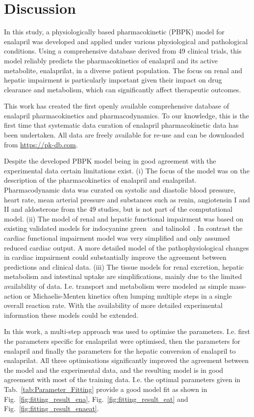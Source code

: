 \section{Discussion}\label{sec:discussion}\justifying{}
In this study, a physiologically based pharmacokinetic (PBPK) model for enalapril was developed and applied under various physiological and pathological conditions. Using a comprehensive database derived from 49 clinical trials, this model reliably predicts the pharmacokinetics of enalapril and its active metabolite, enalaprilat, in a diverse patient population. The focus on renal and hepatic impairment is particularly important given their impact on drug clearance and metabolism, which can significantly affect therapeutic outcomes.

This work has created the first openly available comprehensive database of enalapril pharmacokinetics and pharmacodynamics. To our knowledge, this is the first time that systematic data curation of enalapril pharmacokinetic data has been undertaken. All data are freely available for re-use and can be downloaded from \href{https://pk-db.com}{https://pk-db.com}.

Despite the developed PBPK model being in good agreement with the experimental data certain limitations exist. (i) The focus of the model was on the description of the pharmacokinetics of enalapril and enalaprilat. Pharmacodynamic data was curated on systolic and diastolic blood pressure, heart rate, mean arterial pressure and substances such as renin, angiotensin I and II and aldosterone from the 49 studies, but is not part of the computational model. (ii) The model of renal and hepatic functional impairment was based on existing validated models for indocyanine green~\cite{Koller2021, Koller2021a} and talinolol~\cite{Mallol2023}. In contrast the cardiac functional impairment model was very simplified and only assumed reduced cardiac output. A more detailed model of the pathophysiological changes in cardiac impairment could substantially improve the agreement between predictions and clinical data. (iii) The tissue models for renal excretion, hepatic metabolism and intestinal uptake are simplifications, mainly due to the limited availability of data. I.e. transport and metabolism were modeled as simple mass-action or Michaelis-Menten kinetics often lumping multiple steps in a single overall reaction rate. With the availability of more detailed experimental information these models could be extended.

In this work, a multi-step approach was used to optimise the parameters. I.e. first the parameters specific for enalaprilat were optimised, then the parameters for enalapril and finally the parameters for the hepatic conversion of enalapril to enalaprilat. All three optimisations significantly improved the agreement between the model and the experimental data, and the resulting model is in good agreement with most of the training data. I.e. the optimal parameters given in Tab.~\ref{tab:Parameter_Fitting} provide a good model fit as shown in Fig.~\ref{fig:fitting_result_ena}, Fig.~\ref{fig:fitting_result_eat} and Fig.~\ref{fig:fitting_result_enaeat}. 

